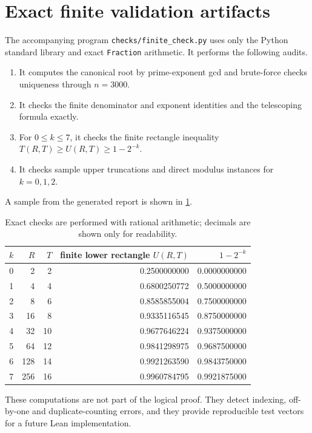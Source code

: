 \documentclass[11pt]{article}
\theoremstyle{definition}
\begin{document}
\section{Exact finite validation artifacts}

The accompanying program \texttt{checks/finite\_check.py} uses only the Python
standard library and exact \texttt{Fraction} arithmetic.  It performs the
following audits.
\begin{enumerate}[label=(\arabic*)]
\item It computes the canonical root by prime-exponent gcd and brute-force
      checks uniqueness through $n=3000$.
\item It checks the finite denominator and exponent identities and the
      telescoping formula exactly.
\item For $0\le k\le7$, it checks the finite rectangle inequality
      $T(R,T)\ge U(R,T)\ge1-2^{-k}$.
\item It checks sample upper truncations and direct modulus instances for
      $k=0,1,2$.
\end{enumerate}
A sample from the generated report is shown in \cref{tab:checks}.

\begin{table}[ht]
\centering
\small
\begin{tabular}{rrrrr}
\toprule
$k$ & $R$ & $T$ & finite lower rectangle $U(R,T)$ & $1-2^{-k}$\\
\midrule
0 & 2   & 2  & 0.2500000000 & 0.0000000000\\
1 & 4   & 4  & 0.6800250772 & 0.5000000000\\
2 & 8   & 6  & 0.8585855004 & 0.7500000000\\
3 & 16  & 8  & 0.9335116545 & 0.8750000000\\
4 & 32  & 10 & 0.9677646224 & 0.9375000000\\
5 & 64  & 12 & 0.9841298975 & 0.9687500000\\
6 & 128 & 14 & 0.9921263590 & 0.9843750000\\
7 & 256 & 16 & 0.9960784795 & 0.9921875000\\
\bottomrule
\end{tabular}
\caption{Exact checks are performed with rational arithmetic; decimals are
shown only for readability.}
\label{tab:checks}
\end{table}

These computations are not part of the logical proof.  They detect indexing,
off-by-one and duplicate-counting errors, and they provide reproducible test
vectors for a future Lean implementation.
\end{document}
